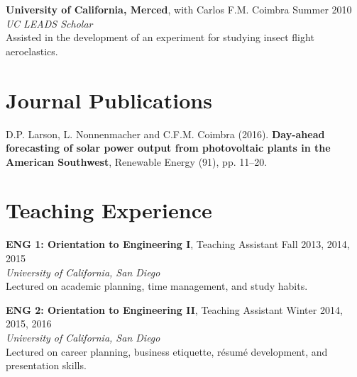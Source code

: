 \documentclass[]{res}
\begin{document}
\begin{resume}
\textbf{University of California, Merced}, with Carlos F.M. Coimbra \hfill Summer 2010 \\
\textit{UC LEADS Scholar} \\
Assisted in the development of an experiment for studying insect flight aeroelastics.


%


\section{Journal Publications}
\vspace{0.1in}

D.P. Larson, L. Nonnenmacher and C.F.M. Coimbra (2016). \textbf{Day-ahead forecasting of solar power output from photovoltaic plants in the American Southwest}, Renewable Energy (91), pp. 11--20.


\section{Teaching Experience}
\vspace{0.1in}

\textbf{ENG 1: Orientation to Engineering I}, Teaching Assistant \hfill Fall 2013, 2014, 2015 \\
\textit{University of California, San Diego} \\
Lectured on academic planning, time management, and study habits.

\textbf{ENG 2: Orientation to Engineering II}, Teaching Assistant \hfill Winter 2014, 2015, 2016 \\
\textit{University of California, San Diego} \\
Lectured on career planning, business etiquette, r\'esum\'e development, and presentation skills.


\end{resume}
\end{document}
